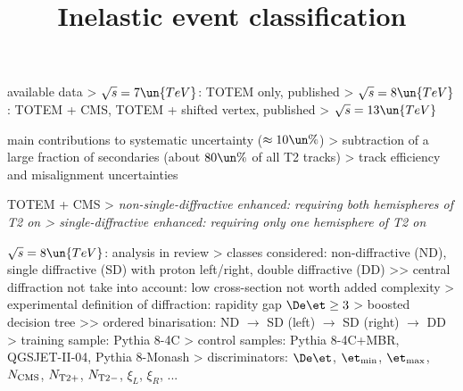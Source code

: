 \> available data
\>> $\sqrt s = 7\un{TeV}$: TOTEM only, published
\>> $\sqrt s = 8\un{TeV}$: TOTEM + CMS, TOTEM + shifted vertex, published
\>> $\sqrt s = 13\un{TeV}$ 


\newpage %


\centerline{
	\hskip3mm
}
\centerline{
	\hskip8cm
}

\> main contributions to systematic uncertainty ($\approx 10\un{\%}$)
\>> subtraction of a large fraction of secondaries (about $80\un{\%}$ of all T2 tracks)
\>> track efficiency and misalignment uncertainties




\newpage %

\vskip-1mm
\> TOTEM + CMS
\>> \em{non-single-diffractive enhanced}: requiring both hemispheres of T2 on
\>> \em{single-diffractive enhanced}: requiring only one hemisphere of T2 on

\centerline{
	\hskip3mm
}


\vskip-1mm


\newpage %
\title{Inelastic event classification}

\> $\sqrt s = 8\un{TeV}$: analysis in review
\>> classes considered: non-diffractive (ND), single diffractive (SD) with proton left/right, double diffractive (DD)
\>>> central diffraction not take into account: low cross-section not worth added complexity
\>> experimental definition of diffraction: rapidity gap $\De\et \ge 3$
\>> boosted decision tree
\>>> ordered binarisation: ND $\rightarrow$ SD (left) $\rightarrow$ SD (right) $\rightarrow$ DD
\>> training sample: Pythia 8-4C
\>> control samples: Pythia 8-4C+MBR, QGSJET-II-04, Pythia 8-Monash
\>> discriminators: $\De\et$, $\et_{\rm min}$, $\et_{\rm max}$, $N_{\rm CMS}$, $N_{\rm T2+}$, $N_{\rm T2-}$, $\xi_L$, $\xi_R$, ...

